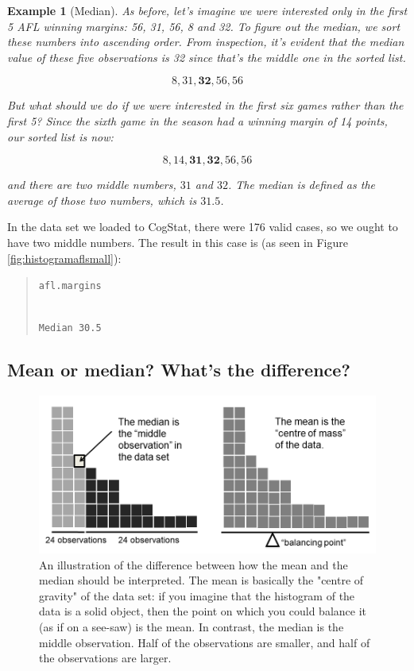 \documentclass[
  11pt,
]{book}
\theoremstyle{indenteddefinition}
\theoremstyle{indenteddefinition}
\newtheorem{example}{Example}[chapter]
\theoremstyle{definition}
\theoremstyle{definition}
\theoremstyle{remark}
\begin{document}
\begin{example}[Median]
\protect\hypertarget{exm:exmedian}{}\label{exm:exmedian}As before, let's imagine we were interested only in the first 5 AFL winning margins: 56, 31, 56, 8 and 32. To figure out the median, we sort these numbers into ascending order. From inspection, it's evident that the median value of these five observations is 32 since that's the middle one in the sorted list.

\[
8, 31, \mathbf{32}, 56, 56
\]

But what should we do if we were interested in the first six games rather than the first 5? Since the sixth game in the season had a winning margin of 14 points, our sorted list is now:

\[
8, 14, \mathbf{31}, \mathbf{32}, 56, 56
\]

and there are \emph{two} middle numbers, \(31\) and \(32\). The median is defined as the average of those two numbers, which is \(31.5\).
\end{example}

In the data set we loaded to CogStat, there were 176 valid cases, so we ought to have two middle numbers. The result in this case is (as seen in Figure \ref{fig:histogramaflsmall}):

\begin{quote}
\texttt{afl.margins}\strut \\
\texttt{Median\ 30.5}
\end{quote}

\hypertarget{mean-or-median-whats-the-difference}{%
\subsection{Mean or median? What's the difference?}\label{mean-or-median-whats-the-difference}}

\begin{figure}

{\centering \includegraphics[width=0.66\linewidth]{./resources/image/meanmedian} 

}

\caption[An illustration of the difference between how the mean and the median should be interpreted.]{An illustration of the difference between how the mean and the median should be interpreted. The mean is basically the "centre of gravity" of the data set: if you imagine that the histogram of the data is a solid object, then the point on which you could balance it (as if on a see-saw) is the mean. In contrast, the median is the middle observation. Half of the observations are smaller, and half of the observations are larger.}\label{fig:meanmedian}
\end{figure}
\end{document}
